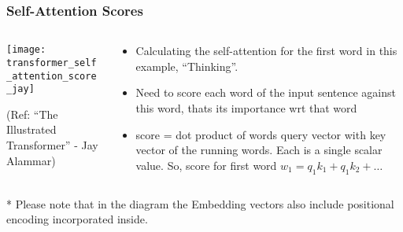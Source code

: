 \begin{frame}[fragile]\frametitle{Self-Attention Scores}

\begin{columns}
    \begin{column}[T]{0.5\linewidth}
\begin{center}
\texttt{[image: transformer\_self\_attention\_score\_jay]}


{\tiny (Ref: ``The Illustrated Transformer'' - Jay Alammar)}
\end{center}		

		\end{column}
    \begin{column}[T]{0.5\linewidth}

\begin{itemize}
\item Calculating the self-attention for the first word in this example, “Thinking”. 
\item Need to score each word of the input sentence against this word, thats its importance wrt that word
\item score = dot product of words query vector with key vector of the running words. Each is a single scalar value. So, score for first word $w_1 = q_1 k_1 + q_1 k_2 + \ldots$
\end{itemize}
    \end{column}
  \end{columns}

* Please note that in the diagram the Embedding vectors also include positional encoding incorporated inside.
\end{frame}

